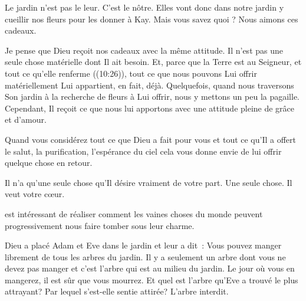 Le jardin n'est pas le leur. C'est le nôtre. Elles vont donc dans notre jardin
 y cueillir nos fleurs pour les donner à Kay.
 Mais vous savez quoi ? Nous aimons ces cadeaux.

Je pense que Dieu reçoit nos cadeaux avec la même attitude.
 Il n'est pas une seule chose matérielle dont Il ait besoin.
 Et, parce que \og la Terre est au Seigneur, et tout ce qu'elle renferme \fg{}
 ((10:26)), tout ce que nous pouvons Lui offrir matériellement
 Lui appartient, en fait, déjà. Quelquefois, quand nous traversons Son jardin
 à la recherche de fleurs à Lui offrir, nous y mettons un peu la pagaille.
 Cependant, Il reçoit ce que nous lui apportons avec une attitude
 pleine de grâce et d'amour.

Quand vous considérez tout ce que Dieu a fait pour vous
 et tout ce qu'Il a offert \ocadr le salut, la purification,
 l'espérance du ciel \fcadr{} cela vous donne envie de lui offrir
 quelque chose en retour.


Il n'a qu'une seule chose qu'Il désire vraiment de votre part.
 Une seule chose. Il veut votre c\oe{}ur. 

\dvrule







 est intéressant de réaliser comment les vaines choses
 du monde peuvent progressivement nous faire tomber sous leur charme.

Dieu a placé Adam et Eve dans le jardin et leur a dit~:
 \og Vous pouvez manger librement de tous les arbres du jardin.
 Il y a seulement un arbre dont vous ne devez pas manger et c'est l'arbre
 qui est au milieu du jardin. Le jour où vous en mangerez,
 il est sûr que vous mourrez. \fg{}
 Et quel est l'arbre qu'Eve a trouvé le plus attrayant?
 Par lequel s'est-elle sentie attirée? L'arbre interdit.

